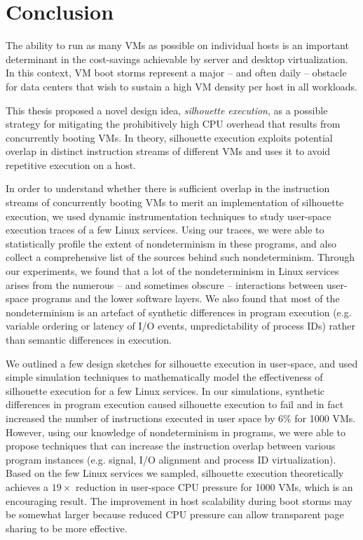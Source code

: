 \chapter{Conclusion} \label{ch:conc}
The ability to run as many VMs as possible
on individual hosts is an important determinant
in the cost-savings achievable
by server and desktop virtualization.
In this context, VM boot storms represent a major -- and often daily -- 
obstacle for data centers that wish to sustain a high VM density
per host in all workloads.

This thesis proposed a novel
design idea, {\em silhouette execution},
as a possible strategy for
mitigating the prohibitively high
CPU overhead that results from concurrently
booting VMs. In theory, silhouette execution 
exploits potential overlap in distinct instruction streams
of different VMs and uses it to avoid repetitive
execution on a host.

In order to understand whether
there is sufficient overlap in the instruction streams of
concurrently booting VMs to merit an implementation of 
silhouette execution, we used dynamic instrumentation 
techniques to study user-space execution traces of 
a few Linux services. Using our traces,
we were able to statistically profile
the extent of nondeterminism in these programs,
and also collect a comprehensive list of 
the sources behind such nondeterminism.
Through our experiments, we found that a
lot of the nondeterminism in Linux services
arises from the numerous -- and sometimes obscure --
interactions between user-space programs
and the lower software layers. We also
found that most of the nondeterminism
is an artefact of synthetic differences
in program execution (e.g. variable ordering
or latency of I/O events, unpredictability
of process IDs) rather than 
semantic differences in execution.

We outlined a few design sketches
for silhouette execution in user-space,
and used simple simulation techniques to
mathematically model the effectiveness of 
silhouette execution for a few Linux services. In
our simulations, synthetic differences in program execution
caused silhouette execution to fail and in fact
increased the number of instructions
executed in user space by 6\% for 1000 VMs.
However, using our knowledge of nondeterminism
in programs, we were able to propose
techniques that can increase
the instruction overlap 
between various program instances (e.g.
signal, I/O alignment and process ID virtualization).
Based on the few Linux services we sampled, silhouette execution
theoretically achieves a $19\times$ reduction
in user-space CPU pressure for 1000 VMs,
which is an encouraging result. 
The improvement in host scalability
during boot storms may be somewhat larger
because reduced CPU pressure can allow
transparent page sharing to be more
effective.

